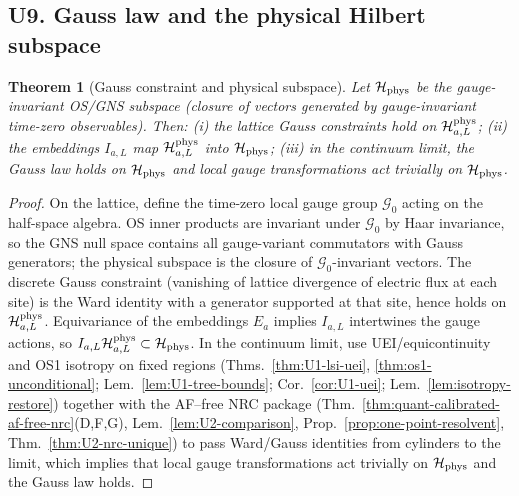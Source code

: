 \documentclass[11pt]{amsart}
\theoremstyle{plain}
\newtheorem{theorem}{Theorem}[section]
\theoremstyle{definition}
\theoremstyle{remark}
\begin{document}
\subsection{U9. Gauss law and the physical Hilbert subspace}
\begin{theorem}[Gauss constraint and physical subspace]\label{thm:U9-gauss}
Let $\mathcal H_{\rm phys}$ be the gauge-invariant OS/GNS subspace (closure of vectors generated by gauge-invariant time-zero observables). Then: (i) the lattice Gauss constraints hold on $\mathcal H_{a,L}^{\rm phys}$; (ii) the embeddings $I_{a,L}$ map $\mathcal H_{a,L}^{\rm phys}$ into $\mathcal H_{\rm phys}$; (iii) in the continuum limit, the Gauss law holds on $\mathcal H_{\rm phys}$ and local gauge transformations act trivially on $\mathcal H_{\rm phys}$.
\end{theorem}
\begin{proof}
On the lattice, define the time-zero local gauge group $\mathcal G_0$ acting on the half-space algebra. OS inner products are invariant under $\mathcal G_0$ by Haar invariance, so the GNS null space contains all gauge-variant commutators with Gauss generators; the physical subspace is the closure of $\mathcal G_0$-invariant vectors. The discrete Gauss constraint (vanishing of lattice divergence of electric flux at each site) is the Ward identity with a generator supported at that site, hence holds on $\mathcal H_{a,L}^{\rm phys}$. Equivariance of the embeddings $E_a$ implies $I_{a,L}$ intertwines the gauge actions, so $I_{a,L} \mathcal H_{a,L}^{\rm phys}\subset\mathcal H_{\rm phys}$. In the continuum limit, use UEI/equicontinuity and OS1 isotropy on fixed regions (Thms.~\ref{thm:U1-lsi-uei}, \ref{thm:os1-unconditional}; Lem.~\ref{lem:U1-tree-bounds}; Cor.~\ref{cor:U1-uei}; Lem.~\ref{lem:isotropy-restore}) together with the AF--free NRC package (Thm.~\ref{thm:quant-calibrated-af-free-nrc}(D,F,G), Lem.~\ref{lem:U2-comparison}, Prop.~\ref{prop:one-point-resolvent}, Thm.~\ref{thm:U2-nrc-unique}) to pass Ward/Gauss identities from cylinders to the limit, which implies that local gauge transformations act trivially on $\mathcal H_{\rm phys}$ and the Gauss law holds.
\end{proof}
\end{document}
